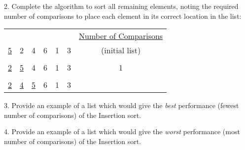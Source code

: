 \documentclass[11pt]{article}
\begin{document}
2. Complete the algorithm to sort all remaining elements, noting the required number of comparisons to place each element in its correct location in the list:

\begin{tabular}{c c c c c c c}

& & & & & & \underline{Number of Comparisons} \\

\underline{5} & 2 & 4 & 6 & 1 & 3 & (initial list) \\ \\

\underline{2} & \underline{5} & 4 & 6 & 1 & 3 & 1 \\ \\

\underline{2} & \underline{4} & \underline{5} & 6 & 1 & 3 \\


\end{tabular}

\vspace*{1.5in}

3. Provide an example of a list which would give the {\it best} performance (fewest number of comparisons) of the Insertion sort.

\vspace*{0.5in}

4.  Provide an example of a list which would give the {\it worst} performance (most number of comparisons) of the Insertion sort.


 
\end{document}
